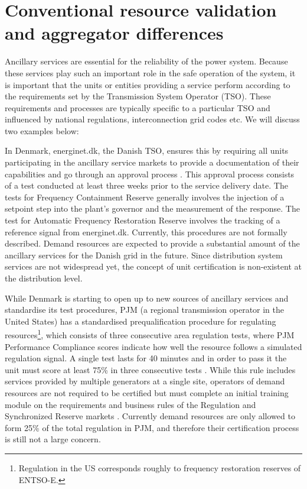 \section{Conventional resource validation and aggregator differences}\label{sec:PSSCCconventionalvalidation}
Ancillary services are essential for the reliability of the power system. Because these services play such an important role in the safe operation of the system, it is important that the units or entities providing a service perform according to the requirements set by the Transmission System Operator (TSO). These requirements and processes are typically specific to a particular TSO and influenced by national regulations, interconnection grid codes etc. We will discuss two examples below:

In Denmark, energinet.dk, the Danish TSO, ensures this by requiring all units participating in the ancillary service markets to provide a documentation of their capabilities and go through an approval process \cite{energinettender}. This approval process consists of a test conducted at least three weeks prior to the service delivery date. The tests for Frequency Containment Reserve generally involves the injection of a setpoint step into the plant's governor and the measurement of the response. The test for Automatic Frequency Restoration Reserve involves the tracking of a reference signal from energinet.dk. Currently, this procedures are not formally described.
Demand resources are expected to provide a substantial amount of the ancillary services for the Danish grid in the future. Since distribution system services are not widespread yet, the concept of unit certification is non-existent at the distribution level. 

While Denmark is starting to open up to new sources of ancillary services and standardise its test procedures, PJM (a regional transmission operator in the United States) has a standardised prequalification procedure for regulating resources\footnote{Regulation in the US corresponds roughly to frequency restoration reserves of ENTSO-E.}, which consists of three consecutive area regulation tests, where PJM Performance Compliance scores indicate how well the resource follows a simulated regulation signal. A single test lasts for 40 minutes and in order to pass it the unit must score at least 75\% in three consecutive tests \cite{pjm2015balance}. While this rule includes services provided by multiple generators at a single site, operators of demand resources are not required to be certified but must complete an initial training module on the requirements and business rules of the Regulation and Synchronized Reserve markets \cite{pjm2015certification}. Currently demand resources are only allowed to form 25\% of the total regulation \cite{pjm2015ancillary} in PJM, and therefore their certification process is still not a large concern. 

